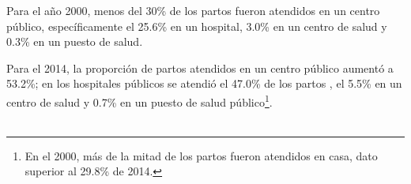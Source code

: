 Para el año 2000, menos del 30\% de los partos fueron atendidos en un centro público, específicamente el  25.6\% en un hospital, 3.0\% en un centro de salud y 0.3\% en un puesto de salud. 

 Para el 2014, la proporción de partos atendidos en un centro público aumentó a 53.2\%; en los hospitales públicos se atendió el 47.0\% de los partos , el 5.5\% en un centro de salud y 0.7\% en un puesto de salud público\footnote{En el 2000, más de la mitad de los partos fueron atendidos en casa, dato superior al  29.8\% de 2014. }.\\\\
 